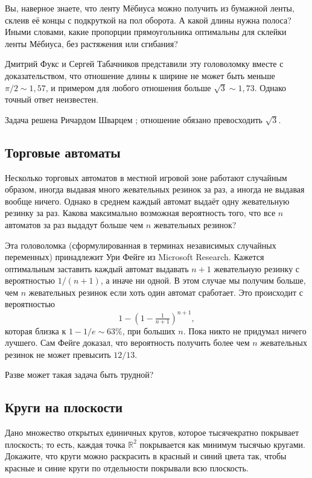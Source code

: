 Вы, наверное знаете, что ленту Мёбиуса можно получить из бумажной ленты, склеив её концы с подкруткой на пол оборота.
А какой длины нужна полоса?
Иными словами, какие пропорции прямоугольника оптимальны для склейки ленты Мёбиуса, без растяжения или сгибания?

Дмитрий Фукс и Сергей Табачников представили эту головоломку \cite[Лекция 14]{19} вместе с доказательством, что отношение длины к ширине не может быть меньше $\pi/2 \sim 1{,}57$, и примером для любого отношения больше $\sqrt{3} \sim 1{,}73$.
Однако точный ответ неизвестен.

\begin{addedbytheeditors}
Задача решена Ричардом Шварцем \cite{schwartz}; отношение обязано превосходить $\sqrt{3}$.
\pr
\end{addedbytheeditors}


\subsection*{Торговые автоматы}

Несколько торговых автоматов в местной игровой зоне работают случайным образом,
иногда выдавая много жевательных резинок за раз, а иногда не выдавая вообще ничего.
Однако в среднем каждый автомат выдаёт одну жевательную резинку за раз.
Какова максимально возможная вероятность того, что все $n$ автоматов за раз выдадут больше чем $n$ жевательных резинок?

\medskip

Эта головоломка (сформулированная в терминах независимых случайных переменных) принадлежит Ури Фейге из Microsoft Research.
Кажется оптимальным заставить каждый автомат выдавать $n + 1$ жевательную резинку с вероятностью $1/(n + 1)$,
а иначе ни одной.
В этом случае мы получим больше, чем $n$ жевательных резинок если хоть один автомат сработает.
Это происходит с вероятностью
\[1-(1-\tfrac1{n+1})^{n+1},\]
которая близка к $1 - 1/e \sim 63\%$, при больших $n$.
Пока никто не придумал ничего лучшего.
Сам Фейге доказал, что вероятность получить более чем $n$ жевательных резинок не может превысить $12/13$.

Разве может такая задача быть трудной?

\subsection*{Круги на плоскости}

Дано множество открытых единичных кругов, которое тысячекратно покрывает плоскость;
то есть, каждая точка $\mathbb{R}^2$ покрывается как минимум тысячью кругами.
Докажите, что круги можно раскрасить в красный и синий цвета так,
чтобы красные и синие круги по отдельности покрывали всю плоскость.

